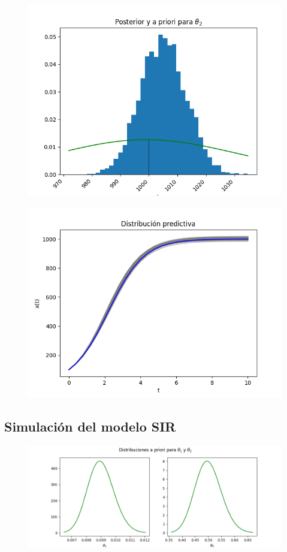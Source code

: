 \begin{figure}[H] 
    \centering 
    \includegraphics[width = 10 cm ]{img/Exp_Central_logistico_sigma/Figuras/Generales/Post_theta2_logistico_sigma.png} 
\end{figure} 


\begin{figure}[H] 
    \centering 
    \includegraphics[width = 10 cm ]{img/Exp_Central_logistico_sigma/Figuras/Generales/Predictiva_logistico_sigma.png} 
\end{figure} 

\subsection{Simulación del modelo SIR}

\begin{figure}[H] 
    \centering 
    \includegraphics[width = 15 cm ]{img/Exp_Central_SIR_sigma/Figuras/Generales/Apriori_SIR_sigma.png} 
\end{figure} 

